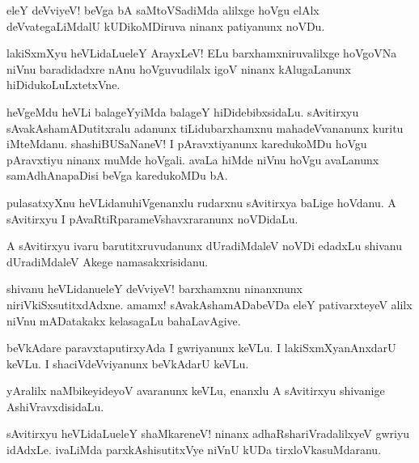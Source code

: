 \begin{mng}
eleY deVviyeV! beVga bA saMtoVSadiMda alilxge hoVgu elAlx deVvategaLiMdalU kUDikoMDiruva ninanx patiyanunx noVDu.
\end{mng}

\begin{mng}
lakiSxmXyu heVLidaLu\mdash eleY ArayxLeV! ELu barxhamxniruvalilxge hoVgoVNa niVnu baradidadxre nAnu hoVguvudilalx igoV ninanx kAlugaLanunx hiDidukoLuLxtetxVne.
\end{mng}

\begin{mng}
heVgeMdu heVLi balageYyiMda balageY hiDidebibxsidaLu. sAvitirxyu sAvakAshamADutitxralu adanunx tiLidubarxhamxnu mahadeVvananunx kuritu iMteMdanu. shashiBUSaNaneV! I pAravxtiyanunx karedukoMDu hoVgu pAravxtiyu ninanx muMde hoVgali. avaLa hiMde niVnu hoVgu avaLanunx samAdhAnapaDisi beVga karedukoMDu bA.
\end{mng}

\begin{mng}
pulasatxyXnu heVLidanu\mdash hiVgenanxlu rudarxnu sAvitirxya baLige hoVdanu. A sAvitirxyu I pAvaRtiRparameVshavxraranunx noVDidaLu.
\end{mng}

\begin{mng}
A sAvitirxyu ivaru barutitxruvudanunx dUradiMdaleV noVDi edadxLu shivanu dUradiMdaleV Akege namasakxrisidanu.
\end{mng}

\begin{mng}
shivanu heVLidanu\mdash eleY deVviyeV! barxhamxnu ninanxnunx niriVkiSxsutitxdAdxne. amamx! sAvakAshamADabeVDa eleY pativarxteyeV alilx niVnu mADatakakx kelasagaLu bahaLavAgive.
\end{mng}

\begin{mng}
beVkAdare paravxtaputirxyAda I gwriyanunx keVLu. I lakiSxmXyanAnxdarU keVLu. I shaciVdeVviyanunx beVkAdarU keVLu.
\end{mng}

\begin{mng}
yAralilx naMbikeyideyoV avaranunx keVLu, enanxlu A sAvitirxyu shivanige AshiVravxdisidaLu.
\end{mng}

\begin{mng}
sAvitirxyu heVLidaLu\mdash eleY shaMkareneV! ninanx adhaRshariVradalilxyeV gwriyu idAdxLe. ivaLiMda parxkAshisutitxVye niVnU kUDa tirxloVkasuMdaranu.
\end{mng}

